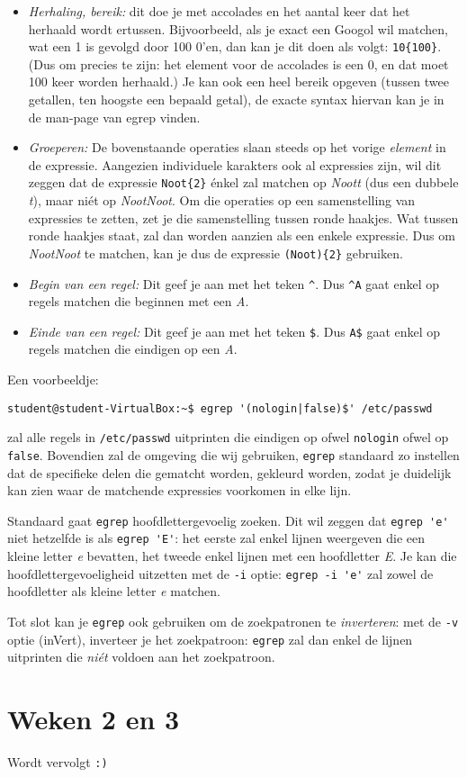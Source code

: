 \documentclass[a4paper,twoside,openany]{memoir}
\begin{document}
\begin{itemize}
\item \emph{Herhaling, bereik:} dit doe je met accolades en het aantal keer dat het herhaald wordt ertussen. Bijvoorbeeld, als je exact een Googol wil matchen, wat een 1 is gevolgd door 100 0'en, dan kan je dit doen als volgt: \verb!10{100}!. (Dus om precies te zijn: het element voor de accolades is een 0, en dat moet 100 keer worden herhaald.) Je kan ook een heel bereik opgeven (tussen twee getallen, ten hoogste een bepaald getal), de exacte syntax hiervan kan je in de man-page van egrep vinden.
\item \emph{Groeperen:} De bovenstaande operaties slaan steeds op het vorige \emph{element} in de expressie. Aangezien individuele karakters ook al expressies zijn, wil dit zeggen dat de expressie \verb!Noot{2}! \'enkel zal matchen op \emph{Noott} (dus een dubbele \emph{t}), maar ni\'et op \emph{NootNoot}. Om die operaties op een samenstelling van expressies te zetten, zet je die samenstelling tussen ronde haakjes. Wat tussen ronde haakjes staat, zal dan worden aanzien als een enkele expressie. Dus om \emph{NootNoot} te matchen, kan je dus de expressie \verb!(Noot){2}! gebruiken.
\item \emph{Begin van een regel:} Dit geef je aan met het teken \verb!^!. Dus \verb!^A! gaat enkel op regels matchen die beginnen met een \emph{A}.
\item \emph{Einde van een regel:} Dit geef je aan met het teken \verb!$!. Dus \verb!A$! gaat enkel op regels matchen die eindigen op een \emph{A}.
\end{itemize}

Een voorbeeldje:

\begin{verbatim}
student@student-VirtualBox:~$ egrep '(nologin|false)$' /etc/passwd
\end{verbatim}

zal alle regels in \verb!/etc/passwd! uitprinten die eindigen op ofwel \verb!nologin! ofwel op \verb!false!. Bovendien zal de omgeving die wij gebruiken, \verb!egrep! standaard zo instellen dat de specifieke delen die gematcht worden, gekleurd worden, zodat je duidelijk kan zien waar de matchende expressies voorkomen in elke lijn.

Standaard gaat \verb!egrep! hoofdlettergevoelig zoeken. Dit wil zeggen dat \verb!egrep 'e'! niet hetzelfde is als \verb!egrep 'E'!: het eerste zal enkel lijnen weergeven die een kleine letter \emph{e} bevatten, het tweede enkel lijnen met een hoofdletter \emph{E}. Je kan die hoofdlettergevoeligheid uitzetten met de \verb!-i! optie: \verb!egrep -i 'e'! zal zowel de hoofdletter als kleine letter \emph{e} matchen.

Tot slot kan je \verb!egrep! ook gebruiken om de zoekpatronen te \emph{inverteren}: met de \verb!-v! optie (inVert), inverteer je het zoekpatroon: \verb!egrep! zal dan enkel de lijnen uitprinten die \emph{ni\'et} voldoen aan het zoekpatroon.

\part{Weken 2 en 3}
Wordt vervolgt \verb!:)!
\end{document}

